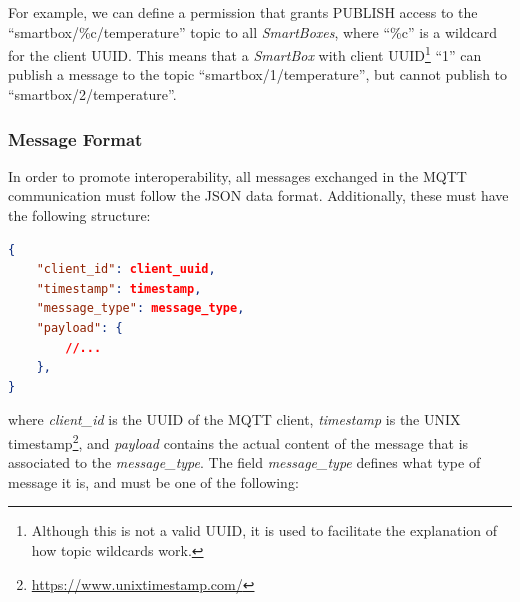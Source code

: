 


For example, we can define a permission that grants PUBLISH access to the ``smartbox/\%c/temperature'' topic to all \textit{SmartBoxes}, where ``\%c'' is a wildcard for the client \acs{UUID}. This means that a \textit{SmartBox} with client \acs{UUID}\footnote{Although this is not a valid \acs{UUID}, it is used to facilitate the explanation of how topic wildcards work.} ``1'' can publish a message to the topic ``smartbox/1/temperature'', but cannot publish to ``smartbox/2/temperature''.

\clearpage 
\subsubsection{Message Format}
\label{sec:mqtt payload format}
In order to promote interoperability, all messages exchanged in the \acs{MQTT} communication must follow the \acs{JSON} data format. Additionally, these must have the following structure:

\begin{lstlisting}[language=json]
{
    "client_id": client_uuid, 
    "timestamp": timestamp,
    "message_type": message_type,
    "payload": {
        //...
    }, 
}  
\end{lstlisting}

where \textit{client\_id} is the \acs{UUID} of the \acs{MQTT} client, \textit{timestamp} is the UNIX timestamp\footnote{\url{https://www.unixtimestamp.com/}}, and \textit{payload} contains the actual content of the message that is associated to the \textit{message\_type}. The field \textit{message\_type} defines what type of message it is, and must be one of the following:



